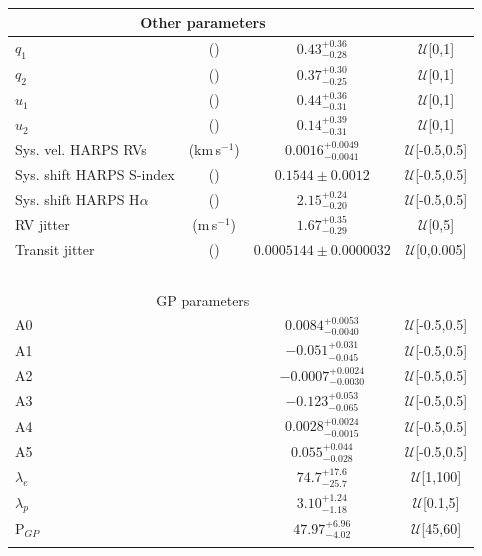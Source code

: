 \documentclass[traditabstract,longauth]{aa}
\begin{document}
\begin{longtable}{lccc}
\hline
\multicolumn{3}{c}{Other parameters} \\
\hline
$q_1$ & () & $ 0.43_{-0.28}^{+0.36} $ & $\mathcal{U}$[0,1]\\ 
$q_2$ & () & $ 0.37_{-0.25}^{+0.30} $ & $\mathcal{U}$[0,1]\\ 
$u_1$ & () & $ 0.44_{-0.31}^{+0.36} $ & $\mathcal{U}$[0,1]\\ 
$u_2$ & () & $ 0.14_{-0.31}^{+0.39} $ & $\mathcal{U}$[0,1]\\ 
Sys. vel. HARPS RVs & (km\,s$^{-1}$) & $ 0.0016_{-0.0041}^{+0.0049} $ & $\mathcal{U}$[-0.5,0.5] \\ 
Sys. shift HARPS S-index & () & $ 0.1544 \pm 0.0012 $ & $\mathcal{U}$[-0.5,0.5] \\
Sys. shift HARPS H$\alpha$ & () & $ 2.15_{-0.20}^{+0.24} $ & $\mathcal{U}$[-0.5,0.5] \\
RV jitter & (m\,s$^{-1}$) & $ 1.67_{-0.29}^{+0.35} $ & $\mathcal{U}$[0,5]\\
Transit jitter & () & $ 0.0005144 \pm 0.0000032 $ & $\mathcal{U}$[0,0.005]\\
\smallskip\\
\smallskip\\
\smallskip\\
\smallskip\\
\smallskip\\
\hline
\multicolumn{3}{c}{GP parameters} \\
\hline
A0 &  & $ 0.0084_{-0.0040}^{+0.0053} $ & $\mathcal{U}$[-0.5,0.5] \\
A1 &  & $ -0.051_{-0.045}^{+0.031} $ & $\mathcal{U}$[-0.5,0.5] \\
A2 &  & $ -0.0007_{-0.0030}^{+0.0024} $ & $\mathcal{U}$[-0.5,0.5] \\
A3 &  & $ -0.123_{-0.065}^{+0.053} $ & $\mathcal{U}$[-0.5,0.5] \\
A4 &  & $ 0.0028_{-0.0015}^{+0.0024} $ & $\mathcal{U}$[-0.5,0.5] \\
A5 &  & $ 0.055_{-0.028}^{+0.044} $ & $\mathcal{U}$[-0.5,0.5] \\
$\lambda_e$ & & $ 74.7_{-25.7}^{+17.6} $ & $\mathcal{U}$[1,100] \\
$\lambda_p$ & & $ 3.10_{-1.18}^{+1.24} $ & $\mathcal{U}$[0.1,5] \\
P$_{GP}$ & & $ 47.97_{-4.02}^{+6.96} $ & $\mathcal{U}$[45,60] \\
\hline
\hline

	
\smallskip\\
\end{longtable}
\end{document}
